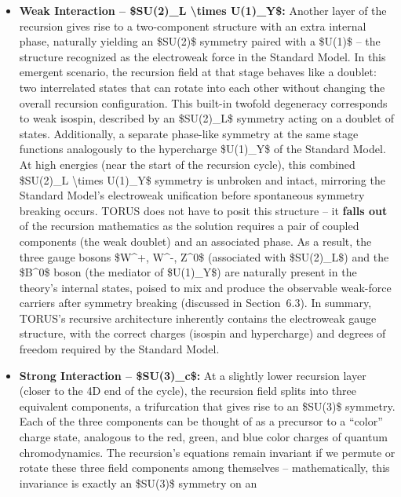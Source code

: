\documentclass[
]{article}
\begin{document}
{\begin{itemize}
\item
  \textbf{Weak Interaction -- \$SU(2)\_L \textbackslash times
  U(1)\_Y\$:} Another layer of the recursion gives rise to a
  two-component structure with an extra internal phase, naturally
  yielding an \$SU(2)\$ symmetry paired with a \$U(1)\$ -- the structure
  recognized as the electroweak force in the Standard Model. In this
  emergent scenario, the recursion field at that stage behaves like a
  doublet: two interrelated states that can rotate into each other
  without changing the overall recursion configuration. This built-in
  twofold degeneracy corresponds to weak isospin, described by an
  \$SU(2)\_L\$ symmetry acting on a doublet of states\hspace{0pt}.
  Additionally, a separate phase-like symmetry at the same stage
  functions analogously to the hypercharge \$U(1)\_Y\$ of the Standard
  Model. At high energies (near the start of the recursion cycle), this
  combined \$SU(2)\_L \textbackslash times U(1)\_Y\$ symmetry is
  unbroken and intact, mirroring the Standard Model's electroweak
  unification before spontaneous symmetry breaking occurs. TORUS does
  not have to posit this structure -- it \textbf{falls out} of the
  recursion mathematics as the solution requires a pair of coupled
  components (the weak doublet) and an associated phase. As a result,
  the three gauge bosons \$W\^{}+, W\^{}-, Z\^{}0\$ (associated with
  \$SU(2)\_L\$) and the \$B\^{}0\$ boson (the mediator of \$U(1)\_Y\$)
  are naturally present in the theory's internal states, poised to mix
  and produce the observable weak-force carriers after symmetry breaking
  (discussed in Section~6.3). In summary, TORUS's recursive architecture
  inherently contains the electroweak gauge structure, with the correct
  charges (isospin and hypercharge) and degrees of freedom required by
  the Standard Model.
\item
  \textbf{Strong Interaction -- \$SU(3)\_c\$:} At a slightly lower
  recursion layer (closer to the 4D end of the cycle), the recursion
  field splits into three equivalent components, a trifurcation that
  gives rise to an \$SU(3)\$ symmetry\hspace{0pt}. Each of the three
  components can be thought of as a precursor to a ``color'' charge
  state, analogous to the red, green, and blue color charges of quantum
  chromodynamics. The recursion's equations remain invariant if we
  permute or rotate these three field components among themselves --
  mathematically, this invariance is exactly an \$SU(3)\$ symmetry on an

\end{itemize}}
\end{document}
